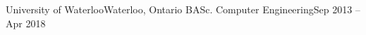 \resumeSubheading
  {University of Waterloo}{Waterloo, Ontario}
  {BASc. Computer Engineering}{Sep 2013 -- Apr 2018}
